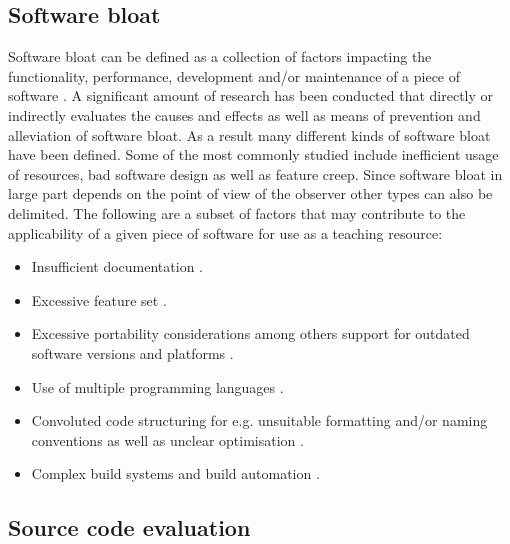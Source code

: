 \subsection{Software bloat}

Software bloat can be defined as a collection of factors impacting the functionality, performance, development and/or maintenance of a piece of software \cite{McGrenere2000AreWA,McGrenere2000BloatTO,Quach2018DebloatingST,Quach2019BloatFA}. A significant amount of research has been conducted that directly or indirectly evaluates the causes \cite{Mitchell2010FourTL} and effects \cite{Quach2019BloatFA} as well as means of prevention \cite{Pike2007ProgramDI,Milicchio2007TheUK} and alleviation \cite{Quach2018DebloatingST} of software bloat. As a result many different kinds of software bloat have been defined. Some of the most commonly studied include inefficient usage of resources, bad software design as well as feature creep. Since software bloat in large part depends on the point of view of the observer other types can also be delimited. The following are a subset of factors that may contribute to the applicability of a given piece of software for use as a teaching resource:

\begin{itemize}
    \item Insufficient documentation \cite{doc-issues,doc-quality}.
    \item Excessive feature set \cite{lean-plea,lean-software,reduction}.
    \item Excessive portability considerations among others support for outdated software versions and platforms \cite{autohell,four-lang}.
    \item Use of multiple programming languages \cite{multi-lang}.
    \item Convoluted code structuring for e.g. unsuitable formatting and/or naming conventions as well as unclear optimisation \cite{convention-violations,variable-naming}.
    \item Complex build systems and build automation \cite{recursive,non-recursive,tool-usage}.
\end{itemize}

\subsection{Source code evaluation}

